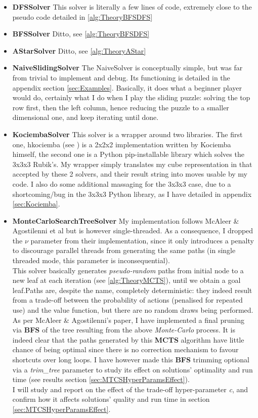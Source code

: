 \begin{itemize}
\item \textbf{DFSSolver} This solver is literally a few lines of code, extremely close to the pseudo code detailed in \ref{alg:TheoryBFSDFS}
\item \textbf{BFSSolver} Ditto, see \ref{alg:TheoryBFSDFS}
\item \textbf{AStarSolver} Ditto, see \ref{alg:TheoryAStar}
\item \textbf{NaiveSlidingSolver} The NaiveSolver is conceptually simple, but was far from trivial to implement and debug. Its functioning is detailed in the appendix section \ref{sec:Examples}. Basically, it does what a beginner player would do, certainly what I do when I play the sliding puzzle: solving the top row first, then the left column, hence reducing the puzzle to a smaller dimensional one, and keep iterating until done.
\item \textbf{KociembaSolver} This solver is a wrapper around two libraries. The first one, hkociemba (see \cite{HKociemba}) is a 2x2x2 implementation written by Kociemba himself, the second one is a Python pip-installable library which solves the 3x3x3 Rubik's. My  wrapper simply translates my cube representation in that accepted by these 2 solvers, and their result string into moves usable by my code. I also do some additional massaging for the 3x3x3 case, due to a shortcoming/bug in the 3x3x3 Python library, as I have detailed in appendix \ref{sec:Kociemba}.
\item \textbf{MonteCarloSearchTreeSolver} My implementation follows McAleer \& Agostilenni et al \cite{https://doi.org/10.48550/arxiv.1805.07470} but is however single-threaded. As a consequence, I dropped the $\nu$ parameter from their implementation, since it only introduces a penalty to discourage parallel threads from generating the same paths (in single threaded mode, this parameter is inconsequential).
\\
This solver basically generates \textit{pseudo-random} paths from initial node to a new leaf at each iteration (see \ref{alg:TheoryMCTS}), until we obtain a goal leaf.Paths are, despite the name, completely deterministic: they indeed result from a trade-off between the probability of actions (penalised for repeated use) and the value function, but there are no random draws being performed.
\\ As per McAleer \& Agostilenni's paper, I have implemented a final pruning via \textbf{BFS} of the tree resulting from the above \textit{Monte-Carlo} process. It is indeed clear that the paths generated by this \textbf{MCTS} algorithm have little chance of being optimal since there is no correction mechanism to favour shortcuts over long loops. I have however made this \textbf{BFS} trimming optional via a \textit{trim\_tree} parameter to study its effect on solutions' optimality and run time (see results section \ref{sec:MTCSHyperParamsEffect}).
\\
I will study and report on the effect of the trade-off hyper-parameter \textit{c}, and confirm how it affects solutions' quality and run time in section \ref{sec:MTCSHyperParamsEffect}.

\end{itemize}

